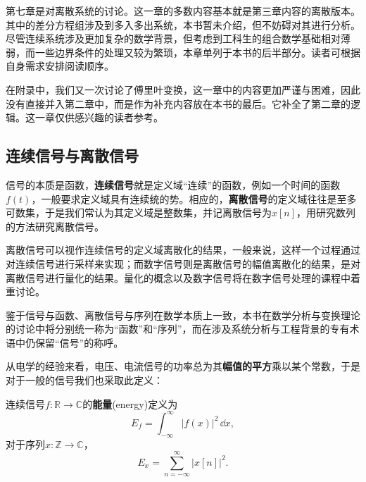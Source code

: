 第七章是对离散系统的讨论。这一章的多数内容基本就是第三章内容的离散版本。其中的差分方程组涉及到多入多出系统，本书暂未介绍，但不妨碍对其进行分析。尽管连续系统涉及更加复杂的数学背景，但考虑到工科生的组合数学基础相对薄弱，而一些边界条件的处理又较为繁琐，本章单列于本书的后半部分。读者可根据自身需求安排阅读顺序。

在附录中，我们又一次讨论了傅里叶变换，这一章中的内容更加严谨与困难，因此没有直接并入第二章中，而是作为补充内容放在本书的最后。它补全了第二章的逻辑。这一章仅供感兴趣的读者参考。

\subsection{连续信号与离散信号}\label{sub:signal}
信号的本质是函数，\textbf{连续信号}就是定义域“连续”的函数，例如一个时间的函数$f(t)$，一般要求定义域具有连续统的势。相应的，\textbf{离散信号}的定义域往往是至多可数集，于是我们常认为其定义域是整数集，并记离散信号为$x[n]$，用研究数列的方法研究离散信号。

离散信号可以视作连续信号的定义域离散化的结果，一般来说，这样一个过程通过对连续信号进行采样来实现；而数字信号则是离散信号的幅值离散化的结果，是对离散信号进行量化的结果。量化的概念以及数字信号将在数字信号处理的课程中着重讨论。

鉴于信号与函数、离散信号与序列在数学本质上一致，本书在数学分析与变换理论的讨论中将分别统一称为“函数”和“序列”，而在涉及系统分析与工程背景的专有术语中仍保留“信号”的称呼。

从电学的经验来看，电压、电流信号的功率总为其\textbf{幅值的平方}乘以某个常数，于是对于一般的信号我们也采取此定义：

\begin{definition}[能量]
    连续信号$f:\mathbb{R}\to\mathbb{C}$的\textbf{能量}(energy)定义为
    \begin{equation}
        E_f=\int_{-\infty}^{\infty}|f(x)|^2\,\dd x,
    \end{equation}
    对于序列$x:\mathbb{Z}\to\mathbb{C}$，
    \begin{equation}
        E_x=\sum_{n = -\infty}^{\infty} |x[n]|^2.
    \end{equation}
\end{definition}

